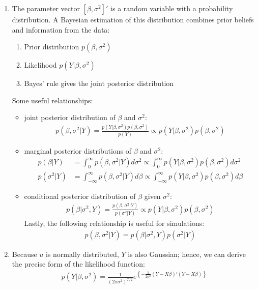 \begin{enumerate}

\item The parameter vector \([\beta,\sigma^2]'\) is a random variable with a probability distribution.
A Bayesian estimation of this distribution combines prior beliefs and information from the data:
\begin{enumerate}
	\item Prior distribution \(p(\beta,\sigma^2)\)
	\item Likelihood \(p(Y|\beta,\sigma^2)\)
	\item Bayes' rule gives the joint posterior distribution
\end{enumerate}
Some useful relationships:
\begin{itemize}
\item joint posterior distribution of \(\beta \) and \(\sigma^2\):
\begin{align*}
p(\beta,\sigma^2|Y) = \frac{p(Y|\beta,\sigma^2) p(\beta,\sigma^2)}{p(Y)} \propto p(Y|\beta,\sigma^2) p(\beta,\sigma^2)
\end{align*}
\item marginal posterior distributions of \(\beta \) and \(\sigma^2\):
\begin{align*}
p(\beta|Y) &= \int_0^\infty p(\beta,\sigma^2|Y) d\sigma^2
\propto \int_0^\infty p(Y|\beta,\sigma^2) p(\beta,\sigma^2) d\sigma^2
\\
p(\sigma^2|Y) &= \int_{-\infty}^{\infty} p(\beta,\sigma^2|Y) d\beta
\propto \int_{-\infty}^{\infty} p(Y|\beta,\sigma^2) p(\beta,\sigma^2) d\beta
\end{align*}
\item conditional posterior distribution of \(\beta \) given \(\sigma^2\):
\begin{align*}
p(\beta|\sigma^2,Y) = \frac{p(\beta,\sigma^2|Y)}{p(\sigma^2|Y)}
\propto p(Y|\beta,\sigma^2) p(\beta,\sigma^2)
\end{align*}
Lastly, the following relationship is useful for simulations:
\begin{align*}
p(\beta,\sigma^2|Y) = p(\beta|\sigma^2,Y) p(\sigma^2|Y)
\end{align*}
\end{itemize}

\item Because \(u\) is normally distributed, \(Y\) is also Gaussian;
hence, we can derive the precise form of the likelihood function:
\begin{align*}
p(Y|\beta,\sigma^2) = \frac{1}{{(2\pi \sigma^2)}^{T/2}} e^{\left \{-\frac{1}{2\sigma^2} (Y-X\beta)'(Y-X\beta)\right \}}
\end{align*}


\end{enumerate}
